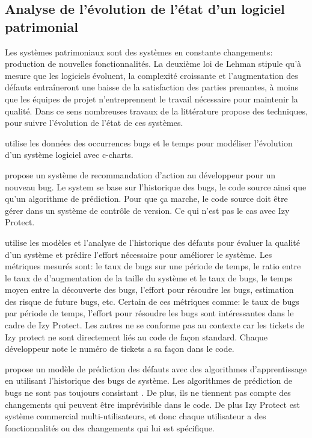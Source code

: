 \documentclass[a4paper]{article}
\begin{document}
\subsection{Analyse de l'évolution de l'état d'un logiciel patrimonial}
\label{sec:etatLogiciel}

Les systèmes  patrimoniaux sont des systèmes en constante changements: production de nouvelles fonctionnalités.
 La deuxième loi de Lehman \cite{Lehm96a} stipule qu'à mesure que les logiciels évoluent, la complexité croissante et l'augmentation des défauts entraîneront une baisse de la satisfaction des parties prenantes, à moins que les équipes de projet n'entreprennent le travail nécessaire pour maintenir la qualité.
 Dans ce sens nombreuses travaux de la littérature propose des techniques, pour suivre l'évolution de l'état de  ces systèmes.
 
\citep{Zhan10a} utilise les données des occurrences bugs et le temps pour modéliser l'évolution d'un système logiciel avec  c-charts.

\citep{lenar17} propose un système de recommandation  d'action au développeur pour un nouveau bug. Le system se  base sur l'historique des bugs, le code source ainsi que qu'un algorithme de prédiction.  Pour que ça marche, le code source doit être gérer dans un système de contrôle de version. Ce qui n'est pas le cas avec Izy Protect.
 
\citep{port17} utilise les modèles  et l'analyse de l'historique des défauts pour évaluer la qualité d'un système et prédire l'effort nécessaire pour améliorer le système. Les métriques mesurés sont: le taux de bugs sur une période de temps, le ratio entre le taux de d'augmentation de la taille du système et le taux de bugs, le temps moyen entre la découverte des bugs, l'effort pour résoudre les bugs, estimation des risque de future bugs, etc. Certain de ces métriques comme: le taux de bugs par période de temps, l'effort pour résoudre les bugs  sont intéressantes dans le cadre de Izy Protect. Les autres ne se conforme pas au contexte car
  les tickets de Izy protect ne sont directement liés au code de façon standard. Chaque développeur note le numéro de tickets a sa façon dans le code. 
 

\citep{kim07,Bibi06} propose  un modèle de prédiction des défauts avec des algorithmes d'apprentissage en utilisant l'historique des bugs de système. 
Les algorithmes de prédiction de bugs ne sont pas toujours consistant \cite{bang19}. De plus, ils ne tiennent pas compte des changements qui peuvent être imprévisible dans le code. De plus Izy Protect est système commercial multi-utilisateurs, et donc chaque utilisateur a des fonctionnalités ou des changements qui lui est spécifique. 
\end{document}
